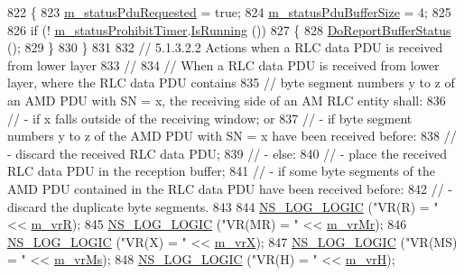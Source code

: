 \begin{DoxyCode}
822         \{
823           \hyperlink{classns3_1_1LteRlcAm_afd4ce0824f86cfb394f0492383f98a3b}{m\_statusPduRequested} = \textcolor{keyword}{true};
824           \hyperlink{classns3_1_1LteRlcAm_a722cecd1994be0d51675dea14b187623}{m\_statusPduBufferSize} = 4;
825 
826           \textcolor{keywordflow}{if} (! \hyperlink{classns3_1_1LteRlcAm_af32da019a7f906fd00bba0f15927817a}{m\_statusProhibitTimer}.\hyperlink{classns3_1_1EventId_aabf8476d1a080c199ea0c6aa9ccea372}{IsRunning} ())
827             \{
828               \hyperlink{classns3_1_1LteRlcAm_ad81917dde659b1c241aa8d22013c8f4b}{DoReportBufferStatus} ();
829             \}
830         \}
831 
832       \textcolor{comment}{// 5.1.3.2.2 Actions when a RLC data PDU is received from lower layer}
833       \textcolor{comment}{//}
834       \textcolor{comment}{// When a RLC data PDU is received from lower layer, where the RLC data PDU contains}
835       \textcolor{comment}{// byte segment numbers y to z of an AMD PDU with SN = x, the receiving side of an AM RLC entity
       shall:}
836       \textcolor{comment}{// - if x falls outside of the receiving window; or}
837       \textcolor{comment}{// - if byte segment numbers y to z of the AMD PDU with SN = x have been received before:}
838       \textcolor{comment}{//     - discard the received RLC data PDU;}
839       \textcolor{comment}{// - else:}
840       \textcolor{comment}{//     - place the received RLC data PDU in the reception buffer;}
841       \textcolor{comment}{//     - if some byte segments of the AMD PDU contained in the RLC data PDU have been received
       before:}
842       \textcolor{comment}{//         - discard the duplicate byte segments.}
843 
844       \hyperlink{group__logging_ga88acd260151caf2db9c0fc84997f45ce}{NS\_LOG\_LOGIC} (\textcolor{stringliteral}{"VR(R)  = "} << \hyperlink{classns3_1_1LteRlcAm_aeec4bcfab747723421c68ed38feea081}{m\_vrR});
845       \hyperlink{group__logging_ga88acd260151caf2db9c0fc84997f45ce}{NS\_LOG\_LOGIC} (\textcolor{stringliteral}{"VR(MR) = "} << \hyperlink{classns3_1_1LteRlcAm_a19fa34df429b9b277b610ae1d8df0005}{m\_vrMr});
846       \hyperlink{group__logging_ga88acd260151caf2db9c0fc84997f45ce}{NS\_LOG\_LOGIC} (\textcolor{stringliteral}{"VR(X)  = "} << \hyperlink{classns3_1_1LteRlcAm_aafbeed1507367d3bcb51a3a5f7d3aa57}{m\_vrX});
847       \hyperlink{group__logging_ga88acd260151caf2db9c0fc84997f45ce}{NS\_LOG\_LOGIC} (\textcolor{stringliteral}{"VR(MS) = "} << \hyperlink{classns3_1_1LteRlcAm_a474fc32f3d26bb6762782e8fd7e01c60}{m\_vrMs});
848       \hyperlink{group__logging_ga88acd260151caf2db9c0fc84997f45ce}{NS\_LOG\_LOGIC} (\textcolor{stringliteral}{"VR(H)  = "} << \hyperlink{classns3_1_1LteRlcAm_a3a0c74b91caa26ab508b4627c703bc1e}{m\_vrH});

\end{DoxyCode}
